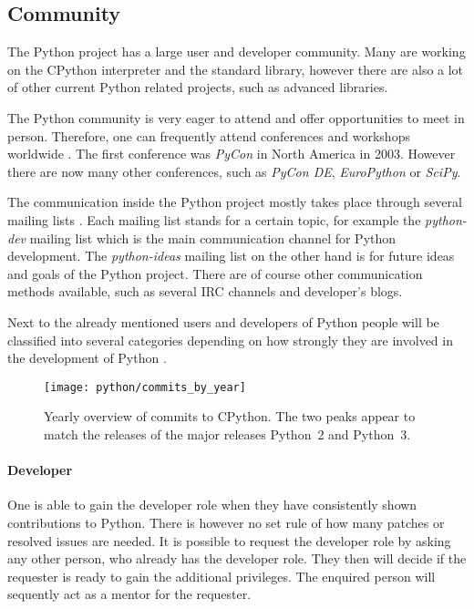 
\subsection{Community} %

The Python project has a large user and developer community. Many are working
on the CPython interpreter and the standard library, however there are also a
lot of other current Python related projects, such as advanced libraries.

The Python community is very eager to attend and offer opportunities to meet in
person. Therefore, one can frequently attend conferences and workshops
worldwide \cite{PythonConferences}. The first conference was \emph{PyCon} in
North America in 2003. However there are now many other conferences, such as
\emph{PyCon DE}, \emph{EuroPython} or \emph{SciPy}.

The communication inside the Python project mostly takes place through several
mailing lists \cite{PythonCommunication}. Each mailing list stands for a
certain topic, for example the \emph{python-dev} mailing list which is the main
communication channel for Python development. The \emph{python-ideas} mailing
list on the other hand is for future ideas and goals of the Python project.
There are of course other communication methods available, such as several
\ac{IRC} channels and developer's blogs.

Next to the already mentioned users and developers of Python people will be
classified into several categories depending on how strongly they are involved
in the development of Python \cite{PythonCoreDeveloper}.

\begin{figure}[htbp]
  \centering
  \texttt{[image: python/commits\_by\_year]}
  \caption[Commits by Year, Python]
  {Yearly overview of commits to CPython. The two peaks appear to match the
    releases of the major releases Python~2 and Python~3.}
  \label{fig:python:cby}
\end{figure}

\paragraph{Developer}

One is able to gain the developer role when they have consistently shown
contributions to Python. There is however no set rule of how many patches or
resolved issues are needed. It is possible to request the developer role by
asking any other person, who already has the developer role. They then will
decide if the requester is ready to gain the additional privileges. The
enquired person will sequently act as a mentor for the requester.

